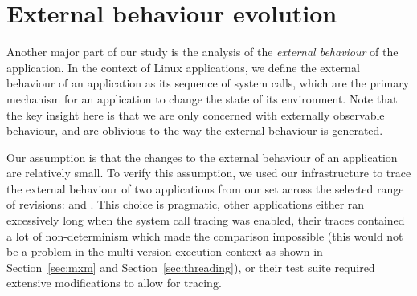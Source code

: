 \section{External behaviour evolution}
\label{evolution:external}


Another major part of our study is the analysis of the \emph{external
behaviour} of the application. In the context of Linux applications, we define
the external behaviour of an application as its sequence of system calls, which
are the primary mechanism for an application to change the state of its
environment.  Note that the key insight here is that we are only concerned with
externally observable behaviour, and are oblivious to the way the external
behaviour is generated.

Our assumption is that the changes to the external behaviour of an application
are relatively small. To verify this assumption, we used our infrastructure to
trace the external behaviour of two applications from our set across the
selected range of revisions: \lighttpd and \lighttpdtwo. This choice is
pragmatic, other applications either ran excessively long when the system call
tracing was enabled, their traces contained a lot of non-determinism which made
the comparison impossible (this would not be a problem in the multi-version
execution context as shown in Section~\ref{sec:mxm} and
Section~\ref{sec:threading}), or their test suite required extensive
modifications to allow for tracing.


